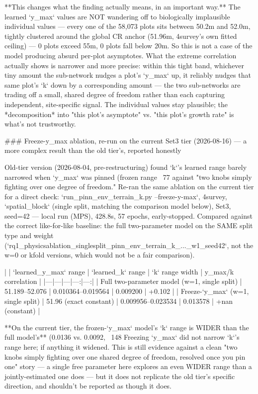 **This changes what the finding actually means, in an important way.** The learned `y_max` values
are NOT wandering off to biologically implausible individual values — every one of the 58,073
plots sits between 50.2m and 52.0m, tightly clustered around the global CR anchor (51.96m,
4survey's own fitted ceiling) — 0 plots exceed 55m, 0 plots fall below 20m. So this is not a case
of the model producing absurd per-plot asymptotes. What the extreme correlation actually shows is
narrower and more precise: within this tight band, whichever tiny amount the sub-network nudges a
plot's `y_max` up, it reliably nudges that same plot's `k` down by a corresponding amount — the two
sub-networks are trading off a small, shared degree of freedom rather than each capturing
independent, site-specific signal. The individual values stay plausible; the *decomposition* into
"this plot's asymptote" vs. "this plot's growth rate" is what's not trustworthy.

### Freeze-y_max ablation, re-run on the current Set3 tier (2026-08-16) — a more complex result than the old tier's, reported honestly

Old-tier version (2026-08-04, pre-restructuring) found `k`'s learned range barely narrowed when
`y_max` was pinned (frozen range ~77%
against "two knobs simply fighting over one degree of freedom." Re-ran the same ablation on the
current tier for a direct check: `run_pinn_env_terrain_k.py --freeze-y-max`, 4survey,
`spatial_block` (single split, matching the comparison model below), Set3, seed=42 — local run
(MPS), 428.8s, 57 epochs, early-stopped. Compared against the correct like-for-like baseline: the
full two-parameter model on the SAME split type and weight
(`rq1_physicsablation_singlesplit_pinn_env_terrain_k_..._w1_seed42`, not the w=0 or kfold versions,
which would not be a fair comparison).

| | `learned_y_max` range | `learned_k` range | `k` range width | y_max/k correlation |
|---|---|---|---:|---:|
| Full two-parameter model (w=1, single split) | 51.189–52.076 | 0.010364–0.019564 | 0.009200 | +0.102 |
| Freeze-`y_max` (w=1, single split) | 51.96 (exact constant) | 0.009956–0.023534 | 0.013578 | +nan (constant) |

**On the current tier, the frozen-`y_max` model's `k` range is WIDER than the full model's** (0.0136
vs. 0.0092, ~148%
Freezing `y_max` did not narrow `k`'s range here; if anything it widened. This is still evidence
against a clean "two knobs simply fighting over one shared degree of freedom, resolved once you pin
one" story — a single free parameter here explores an even WIDER range than a jointly-estimated one
does — but it does not replicate the old tier's specific direction, and shouldn't be reported as
though it does.

